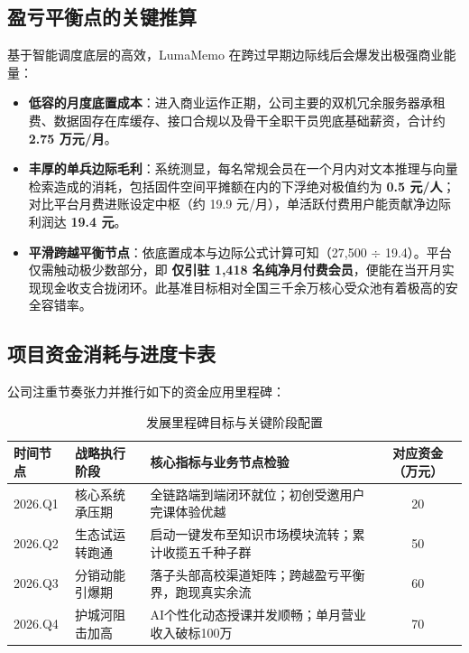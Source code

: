 \subsection{盈亏平衡点的关键推算}
基于智能调度底层的高效，LumaMemo 在跨过早期边际线后会爆发出极强商业能量：
\begin{itemize}
    \item \textbf{低容的月度底置成本}：进入商业运作正期，公司主要的双机冗余服务器承租费、数据固存在库缓存、接口合规以及骨干全职干员兜底基础薪资，合计约 \textbf{2.75 万元/月}。
    \item \textbf{丰厚的单兵边际毛利}：系统测显，每名常规会员在一个月内对文本推理与向量检索造成的消耗，包括固件空间平摊额在内的下浮绝对极值约为 \textbf{0.5 元/人}；对比平台月费进账设定中枢（约 19.9 元/月），单活跃付费用户能贡献净边际利润达 \textbf{19.4 元}。
    \item \textbf{平滑跨越平衡节点}：依底置成本与边际公式计算可知（27,500 $\div$ 19.4）。平台仅需触动极少数部分，即 \textbf{仅引驻 1,418 名纯净月付费会员}，便能在当开月实现现金收支合拢闭环。此基准目标相对全国三千余万核心受众池有着极高的安全容错率。
\end{itemize}

\subsection{项目资金消耗与进度卡表}
公司注重节奏张力并推行如下的资金应用里程碑：
\begin{table}[htbp]
  \centering
  \small
  \caption{发展里程碑目标与关键阶段配置}
  \begin{tabular}{llp{}c}
    \toprule
    \textbf{时间节点} & \textbf{战略执行阶段} & \textbf{核心指标与业务节点检验} & \textbf{对应资金（万元）} \\
    \midrule
    2026.Q1 & 核心系统承压期 & 全链路端到端闭环就位；初创受邀用户完课体验优越 & 20 \\
    2026.Q2 & 生态试运转跑通 & 启动一键发布至知识市场模块流转；累计收揽五千种子群 & 50 \\
    2026.Q3 & 分销动能引爆期 & 落子头部高校渠道矩阵；跨越盈亏平衡界，跑现真实余流 & 60 \\
    2026.Q4 & 护城河阻击加高 & AI个性化动态授课并发顺畅；单月营业收入破标100万 & 70 \\
    \bottomrule
  \end{tabular}
\end{table}
